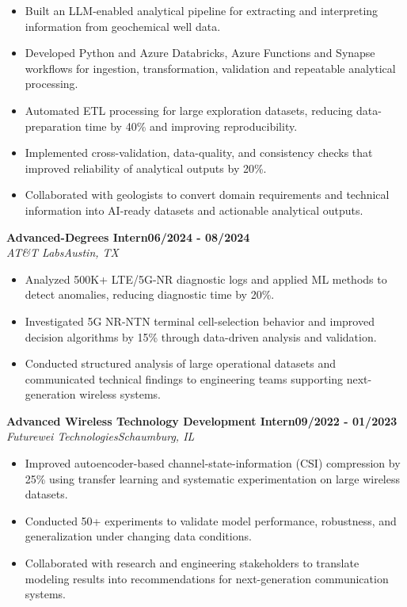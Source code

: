 \documentclass[9pt,letterpaper]{extarticle}
\newcommand{\role}[4]{%
  \Needspace{4\baselineskip}\textbf{#1}\hfill\textbf{#2}\\[-1pt]
  \textit{#3}\hfill\textit{#4}\par}
\begin{document}
\begin{itemize}
\item Built an LLM-enabled analytical pipeline for extracting and interpreting information from geochemical well data.
\item Developed Python and Azure Databricks, Azure Functions and Synapse workflows for ingestion, transformation, validation and repeatable analytical processing.
\item Automated ETL processing for large exploration datasets, reducing data-preparation time by 40\% and improving reproducibility.
\item Implemented cross-validation, data-quality, and consistency checks that improved reliability of analytical outputs by 20\%.
\item Collaborated with geologists to convert domain requirements and technical information into AI-ready datasets and actionable analytical outputs.
\end{itemize}
\role{Advanced-Degrees Intern}{06/2024 - 08/2024}{AT\&T Labs}{Austin, TX}
\begin{itemize}
\item Analyzed 500K+ LTE/5G-NR diagnostic logs and applied ML methods to detect anomalies, reducing diagnostic time by 20\%.
\item Investigated 5G NR-NTN terminal cell-selection behavior and improved decision algorithms by 15\% through data-driven analysis and validation.
\item Conducted structured analysis of large operational datasets and communicated technical findings to engineering teams supporting next-generation wireless systems.
\end{itemize}
\role{Advanced Wireless Technology Development Intern}{09/2022 - 01/2023}{Futurewei Technologies}{Schaumburg, IL}
\begin{itemize}
\item Improved autoencoder-based channel-state-information (CSI) compression by 25\% using transfer learning and systematic experimentation on large wireless datasets.
\item Conducted 50+ experiments to validate model performance, robustness, and generalization under changing data conditions.
\item Collaborated with research and engineering stakeholders to translate modeling results into recommendations for next-generation communication systems.
\end{itemize}
\end{document}
